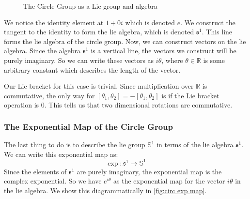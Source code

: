 \begin{figure}[ht]

    \caption{The Circle Group as a Lie group and algebra}
    \label{fig:circle group}
\end{figure}

We notice the identity element at $1+0i$ which is denoted $e$. We construct the tangent to the identity to form the \gls{lie algebra}, which is denoted $\mathfrak{s}^1$. This line forms the \gls{lie algebra} of the circle group. Now, we can construct vectors on the \gls{lie algebra}. Since the algebra $\mathfrak{s}^1$ is a vertical line, the vectors we construct will be purely imaginary. So we can write these vectors as $i\theta$, where $\theta \in \mathbb{R}$ is some arbitrary constant which describes the length of the vector.

Our Lie bracket for this case is trivial. Since multiplication over $\mathbb{R}$ is commutative, the only way for $[\theta_1,\theta_2]=-[\theta_1,\theta_2]$ is if the Lie bracket operation is 0. This tells us that two dimensional rotations are commutative.

\subsubsection{The Exponential Map of the Circle Group}
The last thing to do is to describe the \gls{lie group} $\mathbb{S}^1$ in terms of the \gls{lie algebra} $\mathfrak{s}^1$. We can write this exponential map as:
$$\exp:\mathfrak{s}^1\rightarrow\mathbb{S}^1$$
Since the elements of $\mathfrak{s}^1$ are purely imaginary, the exponential map is the complex exponential. So we have $e^{i\theta}$ as the exponential map for the vector $i\theta$ in the \gls{lie algebra}. We show this diagrammatically in \autoref{fig:circ exp map}.

